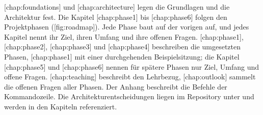 [chap:foundations] und [chap:architecture] legen die Grundlagen und die
Architektur fest.
Die Kapitel \in{}[chap:phase1] bis \in{}[chap:phase6] folgen den Projektphasen
([fig:roadmap]).
Jede Phase baut auf der vorigen auf, und jedes Kapitel nennt ihr Ziel,
ihren Umfang und ihre offenen Fragen.
[chap:phase1], \in{}[chap:phase2], \in{}[chap:phase3] und \in{}[chap:phase4]
beschreiben die umgesetzten Phasen, [chap:phase1] mit einer durchgehenden
Beispielsitzung;
die Kapitel \in{}[chap:phase5] und \in{}[chap:phase6] nennen für spätere Phasen nur Ziel,
Umfang und offene Fragen.
[chap:teaching] beschreibt den Lehrbezug,
[chap:outlook] sammelt die offenen Fragen aller Phasen.
Der Anhang beschreibt die Befehle der Kommandozeile. Die Architekturentscheidungen liegen im
Repository unter  und werden in den Kapiteln referenziert.

\startplacefigure[title={Phasen des Projekts},reference=fig:roadmap,location=here]
\stopplacefigure
